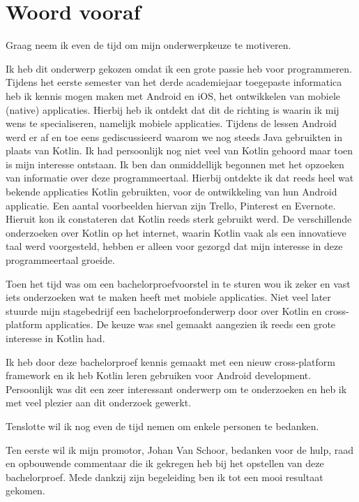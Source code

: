 
\chapter*{Woord vooraf}
\label{ch:voorwoord}

Graag neem ik even de tijd om mijn onderwerpkeuze te motiveren.

Ik heb dit onderwerp gekozen omdat ik een grote passie heb voor programmeren. Tijdens het eerste semester van het derde academiejaar toegepaste informatica heb ik kennis mogen maken met Android en iOS, het ontwikkelen van mobiele (native) applicaties. Hierbij heb ik ontdekt dat dit de richting is waarin ik mij wens te specialiseren, namelijk mobiele applicaties. Tijdens de lessen Android werd er af en toe eens gediscussieerd waarom we nog steeds Java gebruikten in plaats van Kotlin. Ik had persoonlijk nog niet veel van Kotlin gehoord maar toen is mijn interesse ontstaan. Ik ben dan onmiddellijk begonnen met het opzoeken van informatie over deze programmeertaal. Hierbij ontdekte ik dat reeds heel wat bekende applicaties Kotlin gebruikten, voor de ontwikkeling van hun Android applicatie. Een aantal voorbeelden hiervan zijn Trello, Pinterest en Evernote. Hieruit kon ik constateren dat Kotlin reeds sterk gebruikt werd. De verschillende onderzoeken over Kotlin op het internet, waarin Kotlin vaak als een innovatieve taal werd voorgesteld, hebben er alleen voor gezorgd dat mijn interesse in deze programmeertaal groeide.

Toen het tijd was om een bachelorproefvoorstel in te sturen wou ik zeker en vast iets onderzoeken wat te maken heeft met mobiele applicaties. Niet veel later stuurde mijn stagebedrijf een bachelorproefonderwerp door over Kotlin en cross-platform applicaties. De keuze was snel gemaakt aangezien ik reeds een grote interesse in Kotlin had. 

Ik heb door deze bachelorproef kennis gemaakt met een nieuw cross-platform framework en ik heb Kotlin leren gebruiken voor Android development. Persoonlijk was dit een zeer interessant onderwerp om te onderzoeken en heb ik met veel plezier aan dit onderzoek gewerkt.

Tenslotte wil ik nog even de tijd nemen om enkele personen te bedanken.

Ten eerste wil ik mijn promotor, Johan Van Schoor, bedanken voor de hulp, raad en opbouwende commentaar die ik gekregen heb bij het opstellen van deze bachelorproef. Mede dankzij zijn begeleiding ben ik tot een mooi resultaat gekomen.

